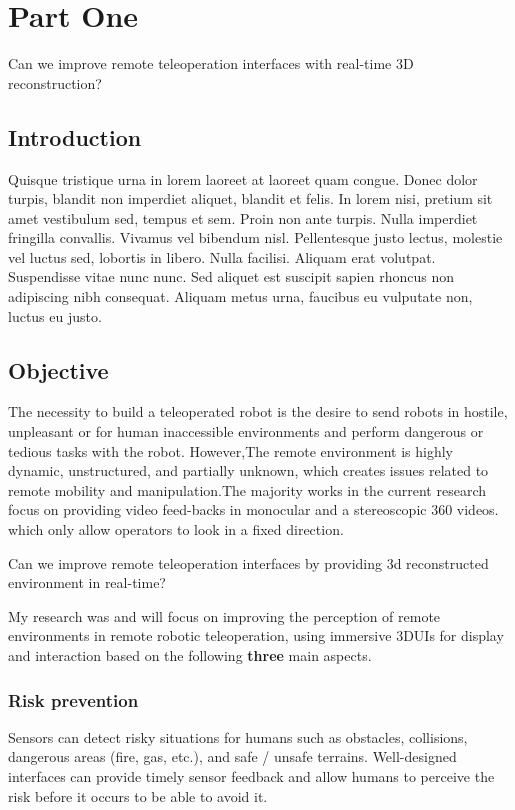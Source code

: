 \chapter{Part One}

Can we improve remote teleoperation interfaces with real-time 3D reconstruction?

\section{Introduction}

Quisque tristique urna in lorem laoreet at laoreet quam congue. Donec dolor turpis, blandit non imperdiet aliquet, blandit et felis. In lorem nisi, pretium sit amet vestibulum sed, tempus et sem. Proin non ante turpis. Nulla imperdiet fringilla convallis. Vivamus vel bibendum nisl. Pellentesque justo lectus, molestie vel luctus sed, lobortis in libero. Nulla facilisi. Aliquam erat volutpat. Suspendisse vitae nunc nunc. Sed aliquet est suscipit sapien rhoncus non adipiscing nibh consequat. Aliquam metus urna, faucibus eu vulputate non, luctus eu justo.


\section{Objective}

The necessity to build a teleoperated robot is the desire to send robots in hostile, unpleasant or for human inaccessible environments and perform dangerous or tedious tasks with the robot. However,The remote environment is highly dynamic, unstructured, and partially unknown, which creates issues related to remote mobility and manipulation.The majority works in the current research focus on providing video feed-backs in monocular and a stereoscopic 360 videos. which only allow operators to look in a fixed direction.

Can we improve remote teleoperation interfaces by providing 3d reconstructed environment in real-time?

My research was and will focus on improving the perception of remote environments in remote robotic teleoperation, using immersive 3DUIs for display and interaction based on the following \textbf{three} main aspects.


\subsection*{Risk prevention} 
Sensors can detect risky situations for humans such as obstacles, collisions, dangerous areas (fire, gas, etc.), and safe / unsafe terrains. Well-designed interfaces can provide timely sensor feedback and allow humans to perceive the risk before it occurs to be able to avoid it.

